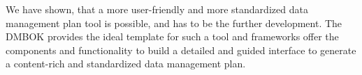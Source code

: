 We have shown, that a more user-friendly and more standardized data management plan tool is possible, and has to be the further development. The DMBOK provides the ideal template for such a tool and frameworks offer the components and functionality to build a detailed and guided interface to generate a content-rich and standardized data management plan.